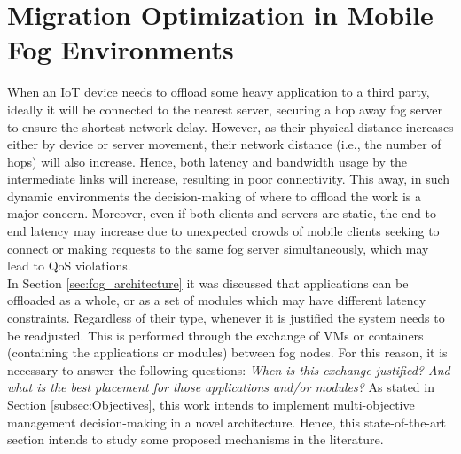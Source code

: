 \section{Migration Optimization in Mobile Fog Environments}
\label{sec:Migration}
When an IoT device needs to offload some heavy application to a third party, ideally it will be connected to the nearest server, securing a hop away fog server to ensure the shortest network delay. However, as their physical distance increases either by device or server movement, their network distance (i.e., the number of hops) will also increase. Hence, both latency and bandwidth usage by the intermediate links will increase, resulting in poor connectivity. This away, in such dynamic environments the decision-making of where to offload the work is a major concern. Moreover, even if both clients and servers are static, the end-to-end latency may increase due to unexpected crowds of mobile clients seeking to connect or making requests to the same fog server simultaneously, which may lead to QoS violations.\\
\noindent\tab In Section \ref{sec:fog_architecture} it was discussed that applications can be offloaded as a whole, or as a set of modules which may have different latency constraints. Regardless of their type, whenever it is justified the system needs to be readjusted. This is performed through the exchange of VMs or containers (containing the applications or modules) between fog nodes. For this reason, it is necessary to answer the following questions: \textit{When is this exchange justified? And what is the best placement for those applications and/or modules?} As stated in Section \ref{subsec:Objectives}, this work intends to implement multi-objective management decision-making in a novel architecture. Hence, this state-of-the-art section intends to study some proposed mechanisms in the literature.

